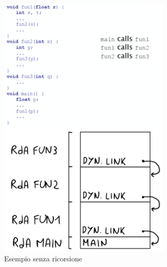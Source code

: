 \documentclass[a4paper,oneside,titlepage]{book}
\begin{document}
\begin{figure}[htp]
	\begin{subfigure}{0.49\textwidth}
		\includegraphics[width=0.9\textwidth, height=0.9\textheight, keepaspectratio]{catDin1.png} 
		\caption{Esempio senza ricorsione}
	\end{subfigure}
	\hfill
	\begin{subfigure}{0.49\textwidth}

\end{subfigure}
\end{figure}
\end{document}
